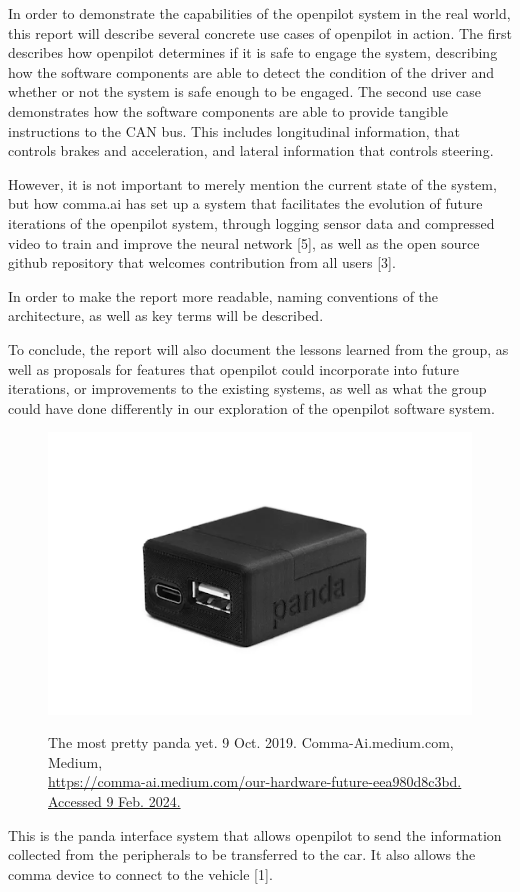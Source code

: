 \documentclass[12pt]{article}
\begin{document}
In order to demonstrate the capabilities of the openpilot system in the real world, this report will describe several concrete use cases of openpilot in action. The first describes how openpilot determines if it is safe to engage the system, describing how the software components are able to detect the condition of the driver and whether or not the system is safe enough to be engaged. The second use case demonstrates how the software components are able to provide tangible instructions to the CAN bus. This includes longitudinal information, that controls brakes and acceleration, and lateral information that controls steering.

However, it is not important to merely mention the current state of the system, but how comma.ai has set up a system that facilitates the evolution of future iterations of the openpilot system, through logging sensor data and compressed video to train and improve the neural network [5], as well as the open source github repository that welcomes contribution from all users [3].

In order to make the report more readable, naming conventions of the architecture, as well as key terms will be described.

To conclude, the report will also document the lessons learned from the group, as well as proposals for features that openpilot could incorporate into future iterations, or improvements to the existing systems, as well as what the group could have done differently in our exploration of the openpilot software system.
\newpage
\begin{figure}[ht]
    \includegraphics[scale=0.5]{Assets/panda.png}\\
    \caption{The most pretty panda yet. 9 Oct. 2019. Comma-Ai.medium.com, Medium,\\ \url{https://comma-ai.medium.com/our-hardware-future-eea980d8c3bd. Accessed 9 Feb. 2024.}}
    \label{fig:enter-label}
\end{figure}
This is the panda interface system that allows openpilot to send the information collected from the peripherals to be transferred to the car. It also allows the comma device to connect to the vehicle [1].
\end{document}
